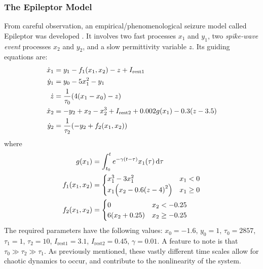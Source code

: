 \subsubsection{The Epileptor Model}
\label{sec:intro_seizures_aetiology_epileptor}
From careful observation, an empirical/phenomenological seizure model called Epileptor was developed \cite{Jirsa2014,Jirsa2017}.
It involves two fast processes $x_{1}$ and $y_{1}$, two \textit{spike-wave event} processes $x_{2}$ and $y_{2}$, and a slow permittivity variable $z$.
Its guiding equations are:
\begin{align}
  \label{eq:epileptor_x1}
  \dot{x}_{1}
  &=
    y_{1}
    -
    f_{1}(x_{1}, x_{2})
    -
    z
    +
    I_{\text{rest} 1} \\
  \label{eq:epileptor_y1}
  \dot{y}_{1}
  &=
    y_{0}
    -
    5 x_{1}^{2}
    -
    y_{1} \\
  \label{eq:epileptor_z}
  \dot{z}
  &=
    \frac{1}{\tau_{0}} \pqty{4 \pqty{x_{1} - x_{0}} - z} \\
  \label{eq:epileptor_x2}
  \dot{x}_{2}
  &=
    -y_{2}
    +
    x_{2}
    -
    x_{2}^{3}
    +
    I_{\text{rest} 2}
    +
    0.002 g(x_{1})
    -
    0.3 \pqty{z - 3.5} \\
  \label{eq:epileptor_y2}
  \dot{y}_{2}
  &=
    \frac{1}{\tau_{2}} \pqty{-y_{2} + f_{2}(x_{1}, x_{2})}
\end{align}
where
\begin{align}
  \label{eq:epileptor_g}
  g(x_{1})
  &=
    \int_{t_{0}}^{t}{e^{-\gamma \pqty{t - \tau}} x_{1}(\tau) \dd{\tau}} \\
  \label{eq:epileptor_f1}
  f_{1}(x_{1}, x_{2})
  &=
    \begin{cases}
      x_{1}^{3} - 3 x_{1}^{2}
      & x_{1} < 0 \\
      x_{1} \pqty{x_{2} - 0.6 \pqty{z - 4}^{2}}
      &
      x_{1} \geq 0
    \end{cases} \\
  \label{eq:epileptor_f2}
  f_{2}(x_{1}, x_{2})
  &=
    \begin{cases}
      0
      & x_{2} < -0.25 \\
      6 \pqty{x_{2} + 0.25}
      & x_{2} \geq -0.25
    \end{cases}
\end{align}
The required parameters have the following values: $x_{0} = -1.6$, $y_{0} = 1$, $\tau_{0} = 2857$, $\tau_{1} = 1$, $\tau_{2} = 10$, $I_{\text{rest} 1} = 3.1$, $I_{\text{rest} 2} = 0.45$, $\gamma = 0.01$.
A feature to note is that $\tau_{0} \gg \tau_{2} \gg \tau_{1}$.
As previously mentioned, these vastly different time scales allow for chaotic dynamics to occur, and contribute to the nonlinearity of the system.

